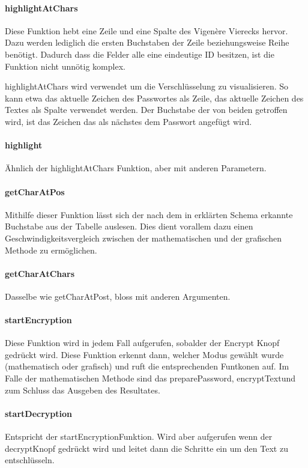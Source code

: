 \documentclass[11pt,paper=a4,final]{scrartcl}
\begin{document}
\paragraph{highlightAtChars}
\label{highlightAtChars}
Diese Funktion hebt eine Zeile und eine Spalte des Vigen\`ere Vierecks hervor.
Dazu werden lediglich die ersten Buchstaben der Zeile beziehungsweise Reihe
ben\"otigt. Dadurch dass die Felder alle eine eindeutige ID besitzen, ist die
Funktion nicht unn\"otig komplex.

highlightAtChars wird verwendet um die Verschl\"usselung zu visualisieren. So
kann etwa das aktuelle Zeichen des Passwortes als Zeile, das aktuelle Zeichen
des Textes als Spalte verwendet werden. Der Buchstabe der von beiden getroffen
wird, ist das Zeichen das als n\"achstes dem Passwort angef\"ugt wird.
\paragraph{highlight}
\"Ahnlich der highlightAtChars Funktion, aber mit anderen Parametern.
\paragraph{getCharAtPos}
Mithilfe dieser Funktion l\"asst sich der nach dem in
\glqq {}\grqq
erkl\"arten Schema erkannte Buchstabe aus der Tabelle auslesen. Dies dient
vorallem dazu einen Geschwindigkeitsvergleich zwischen der mathematischen und
der grafischen Methode zu erm\"oglichen.
\paragraph{getCharAtChars}
Dasselbe wie getCharAtPost, bloss mit anderen Argumenten.
\paragraph{startEncryption}
Diese Funktion wird in jedem Fall aufgerufen, sobalder der \glqq Encrypt\grqq
Knopf gedr\"uckt wird. Diese Funktion erkennt dann, welcher Modus gew\"ahlt
wurde (mathematisch oder grafisch) und ruft die entsprechenden Funtkonen auf.
Im Falle der mathematischen Methode sind das \glqq preparePassword\grqq, \glqq
encryptText\grqq und zum Schluss das Ausgeben des Resultates.
\paragraph{startDecryption}
Entspricht der \glqq startEncryption\grqq Funktion. Wird aber aufgerufen wenn
der \glqq decrypt\grqq Knopf gedr\"uckt wird und leitet dann die Schritte ein um
den Text zu entschl\"usseln.
\end{document}
